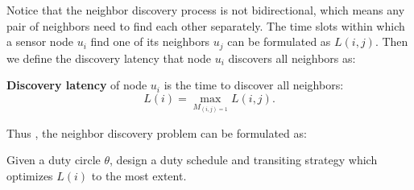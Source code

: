 Notice that the neighbor discovery process is not bidirectional, which means any pair of neighbors 
need to find each other separately. The time slots within which a sensor node $u_i$ find one of its neighbors $u_j$ can be formulated 
as $L(i,j)$. Then we define the discovery latency that node $u_i$ discovers all neighbors as:

\begin{definition}
\textbf{Discovery latency} of node $u_i$ is the time to discover all neighbors:
$$L(i) = \max_{M_{(i,j) = 1}} L (i,j).
$$
\end{definition}

Thus , the neighbor discovery problem can be formulated as:
\begin{problem}
Given a duty circle $\theta$, design a duty schedule and transiting strategy which optimizes $L(i)$ to the most extent. 
\end{problem}



